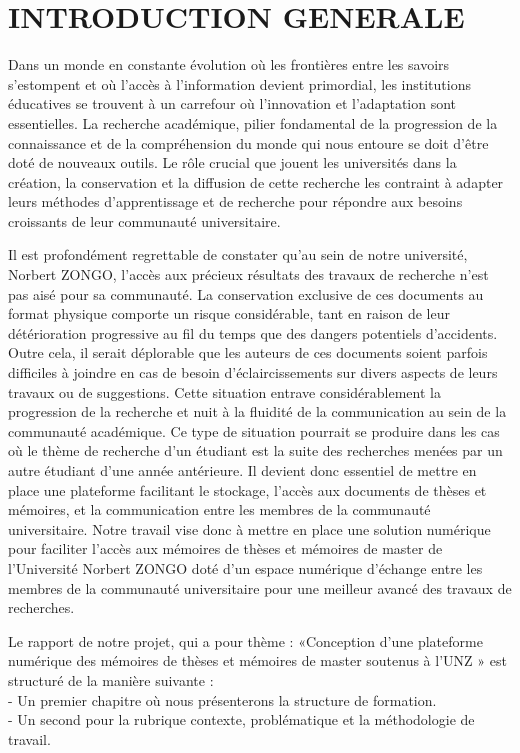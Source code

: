 \chapter*{INTRODUCTION GENERALE}
\adjustmtc
\thispagestyle{MyStyle}


Dans un monde en constante évolution où les frontières entre les savoirs s'estompent et où l'accès à l'information devient primordial, les institutions éducatives se trouvent à un carrefour où l'innovation et l'adaptation sont essentielles. La recherche académique, pilier fondamental de la progression de la connaissance et de la compréhension du monde qui nous entoure se doit d’être doté de nouveaux outils. Le rôle crucial que jouent les universités dans la création, la conservation et la diffusion de cette recherche les contraint à adapter leurs méthodes d'apprentissage et de recherche pour répondre aux besoins croissants de leur communauté universitaire.\par
Il est profondément regrettable de constater qu'au sein de notre université, Norbert ZONGO, l'accès aux précieux résultats des travaux de recherche n'est pas aisé pour sa communauté. La conservation exclusive de ces documents au format physique comporte un risque considérable, tant en raison de leur détérioration progressive au fil du temps que des dangers potentiels d'accidents. Outre cela, il serait déplorable que les auteurs de ces documents soient parfois difficiles à joindre en cas de besoin d’éclaircissements sur divers aspects de leurs travaux ou de suggestions. Cette situation entrave considérablement la progression de la recherche et nuit à la fluidité de la communication au sein de la communauté académique. Ce type de situation pourrait se produire dans les cas où le thème de recherche d’un étudiant est la suite des recherches menées par un autre étudiant d’une année antérieure.
Il devient donc essentiel de mettre en place une plateforme facilitant le stockage, l'accès aux documents de thèses et mémoires, et la communication entre les membres de la communauté universitaire.
Notre travail vise donc à mettre en place une solution numérique pour faciliter l'accès aux mémoires de thèses et mémoires de master de l’Université Norbert ZONGO doté d’un espace numérique d’échange entre les membres de la communauté universitaire pour une meilleur avancé des travaux de recherches.\par
Le rapport de notre projet, qui a pour thème : «Conception d’une plateforme numérique des mémoires de thèses et mémoires de master soutenus à l’UNZ » est structuré de la manière suivante :\\
-	Un premier chapitre où nous présenterons la structure de formation.\\
-	Un second pour la rubrique contexte, problématique et la méthodologie de travail.  \\

